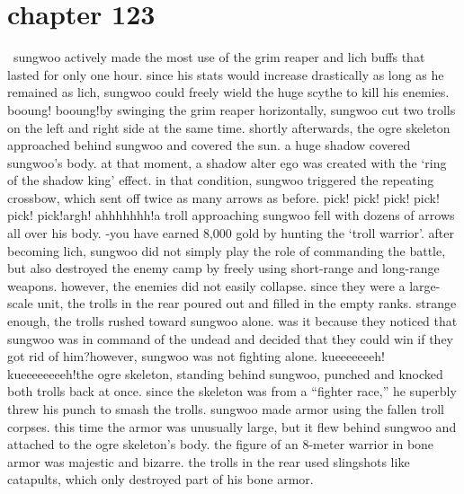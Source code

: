\section{chapter 123}






 sungwoo actively made the most use of the grim reaper and lich buffs that lasted for only one hour.
 since his stats would increase drastically as long as he remained as lich, sungwoo could freely wield the huge scythe to kill his enemies.
booung! booung!by swinging the grim reaper horizontally, sungwoo cut two trolls on the left and right side at the same time.
 shortly afterwards, the ogre skeleton approached behind sungwoo and covered the sun.
 a huge shadow covered sungwoo’s body.
at that moment, a shadow alter ego was created with the ‘ring of the shadow king’ effect.
 in that condition, sungwoo triggered the repeating crossbow, which sent off twice as many arrows as before.
pick! pick! pick! pick! pick! pick!argh! ahhhhhhh!a troll approaching sungwoo fell with dozens of arrows all over his body.
-you have earned 8,000 gold by hunting the ‘troll warrior’.
after becoming lich, sungwoo did not simply play the role of commanding the battle, but also destroyed the enemy camp by freely using short-range and long-range weapons.
however, the enemies did not easily collapse.
 since they were a large-scale unit, the trolls in the rear poured out and filled in the empty ranks.
strange enough, the trolls rushed toward sungwoo alone.
 was it because they noticed that sungwoo was in command of the undead and decided that they could win if they got rid of him?however, sungwoo was not fighting alone.
kueeeeeeeh! kueeeeeeeeh!the ogre skeleton, standing behind sungwoo, punched and knocked both trolls back at once.
since the skeleton was from a “fighter race,” he superbly threw his punch to smash the trolls.
sungwoo made armor using the fallen troll corpses.
 this time the armor was unusually large, but it flew behind sungwoo and attached to the ogre skeleton’s body.
the figure of an 8-meter warrior in bone armor was majestic and bizarre.
 the trolls in the rear used slingshots like catapults, which only destroyed part of his bone armor.


